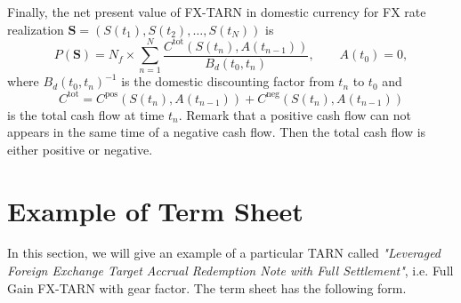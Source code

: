 Finally, the net present value of FX-TARN in domestic currency for FX rate realization $\mathbf{S} = (S(t_1),S(t_2),\ldots,S(t_N))$ is
\begin{equation}\label{eq:intro:pv}
P(\mathbf{S}) =N_f \times \sum_{n=1}^N\frac{C^\text{tot}(S(t_n),A(t_{n-1}))}{B_d(t_0,t_n)}, \qquad A(t_0)=0,
\end{equation}
where $B_d(t_0,t_n)^{-1}$ is the domestic discounting factor from $t_n$ to $t_0$ and 
$$C^\text{tot} = C^\text{pos}(S(t_n),A(t_{n-1}))+C^\text{neg}(S(t_n),A(t_{n-1}))$$ 
is the total cash flow at time $t_n$. Remark that a positive cash flow can not appears in the same time of a negative cash flow. Then the total cash flow is either positive or negative.

\section{Example of Term Sheet}
\label{sec:intro:term_sheet}
In this section, we will give an example of a particular TARN called \textit{"Leveraged Foreign Exchange Target Accrual Redemption Note with Full Settlement"}, i.e. Full Gain FX-TARN with gear factor. The term sheet has the following form.


